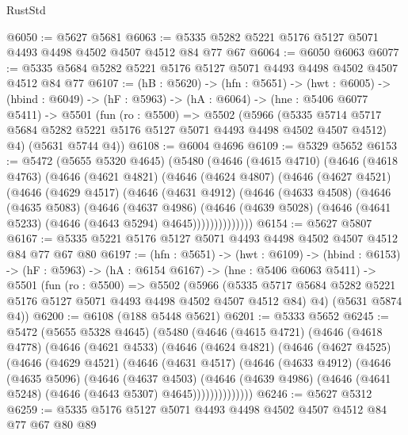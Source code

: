 \begin{lexlean}{RustStd}
\begin{coremodule}
{\begin{coremodule}
{{{{{{{{@6050 := @5627 @5681
@6063 := @5335 @5282 @5221 @5176 @5127 @5071 @4493 @4498 @4502 @4507 @4512 @84 @77 @67
@6064 := @6050 @6063
@6077 := @5335 @5684 @5282 @5221 @5176 @5127 @5071 @4493 @4498 @4502 @4507 @4512 @84 @77
@6107 := (hB : @5620) ->
  (hfn : @5651) ->
  (hwt : @6005) ->
  (hbind : @6049) ->
  (hF : @5963) ->
  (hA : @6064) ->
  (hne : @5406 @6077 @5411) ->
  @5501
    (fun (ro : @5500) =>
    @5502
      (@5966
        (@5335 @5714 @5717 @5684 @5282 @5221 @5176 @5127 @5071 @4493 @4498 @4502 @4507 @4512)
        @4)
      (@5631 @5744 @4))
@6108 := @6004 @4696
@6109 := @5329 @5652
@6153 := @5472
    (@5655 @5320 @4645)
    (@5480
      (@4646
        (@4615 @4710)
        (@4646
          (@4618 @4763)
          (@4646
            (@4621 @4821)
            (@4646
              (@4624 @4807)
              (@4646
                (@4627 @4521)
                (@4646
                  (@4629 @4517)
                  (@4646
                    (@4631 @4912)
                    (@4646
                      (@4633 @4508)
                      (@4646
                        (@4635 @5083)
                        (@4646
                          (@4637 @4986)
                          (@4646
                            (@4639 @5028)
                            (@4646 (@4641 @5233) (@4646 (@4643 @5294) @4645))))))))))))))
@6154 := @5627 @5807
@6167 := @5335 @5221 @5176 @5127 @5071 @4493 @4498 @4502 @4507 @4512 @84 @77 @67 @80
@6197 := (hfn : @5651) ->
  (hwt : @6109) ->
  (hbind : @6153) ->
  (hF : @5963) ->
  (hA : @6154 @6167) ->
  (hne : @5406 @6063 @5411) ->
  @5501
    (fun (ro : @5500) =>
    @5502
      (@5966 (@5335 @5717 @5684 @5282 @5221 @5176 @5127 @5071 @4493 @4498 @4502 @4507 @4512 @84) @4)
      (@5631 @5874 @4))
@6200 := @6108 (@188 @5448 @5621)
@6201 := @5333 @5652
@6245 := @5472
    (@5655 @5328 @4645)
    (@5480
      (@4646
        (@4615 @4721)
        (@4646
          (@4618 @4778)
          (@4646
            (@4621 @4533)
            (@4646
              (@4624 @4821)
              (@4646
                (@4627 @4525)
                (@4646
                  (@4629 @4521)
                  (@4646
                    (@4631 @4517)
                    (@4646
                      (@4633 @4912)
                      (@4646
                        (@4635 @5096)
                        (@4646
                          (@4637 @4503)
                          (@4646
                            (@4639 @4986)
                            (@4646 (@4641 @5248) (@4646 (@4643 @5307) @4645))))))))))))))
@6246 := @5627 @5312
@6259 := @5335 @5176 @5127 @5071 @4493 @4498 @4502 @4507 @4512 @84 @77 @67 @80 @89
}}}}}}}}
\end{coremodule}}
\end{coremodule}
\end{lexlean}
